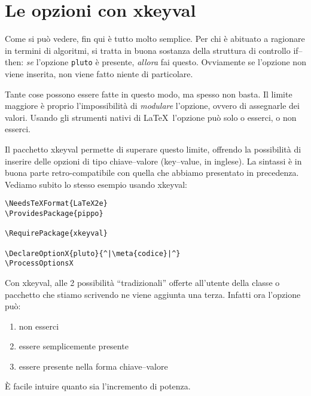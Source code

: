\documentclass{scrartcl}
\newcommand{\meta}[1]{$\langle$\textit{#1}$\rangle$}
\begin{document}
\section{Le opzioni con xkeyval}
Come si può vedere, fin qui è tutto molto semplice. Per chi è abituato a ragionare in termini di algoritmi, si tratta in buona sostanza della struttura di controllo if--then: \emph{se} l'opzione \lstinline+pluto+ è presente, \emph{allora} fai questo. Ovviamente se l'opzione non viene inserita, non viene fatto niente di particolare.

Tante cose possono essere fatte in questo modo, ma spesso non basta. Il limite maggiore è proprio l'impossibilità di \emph{modulare} l'opzione, ovvero di assegnarle dei valori.  Usando gli strumenti nativi di \LaTeX\ l'opzione può solo o esserci, o non esserci.

Il pacchetto xkeyval permette di superare questo limite, offrendo la possibilità di inserire delle opzioni di tipo chiave--valore (key--value, in inglese). La sintassi è in buona parte retro-compatibile con quella che abbiamo presentato in precedenza. Vediamo subito lo stesso esempio usando xkeyval:
\begin{lstlisting}
\NeedsTeXFormat{LaTeX2e}
\ProvidesPackage{pippo}

\RequirePackage{xkeyval}

\DeclareOptionX{pluto}{^|\meta{codice}|^}
\ProcessOptionsX
\end{lstlisting}

Con xkeyval, alle 2 possibilità ``tradizionali'' offerte all'utente della classe o pacchetto che stiamo scrivendo ne viene aggiunta una terza. Infatti ora l'opzione può:
\begin{enumerate}
\item non esserci
\item essere semplicemente presente
\item essere presente nella forma chiave--valore
\end{enumerate}
È facile intuire quanto sia l'incremento di potenza.
\end{document}
